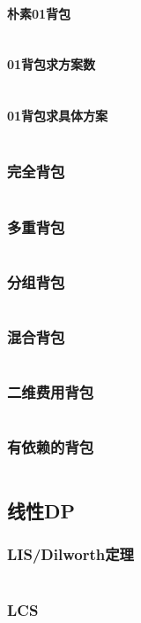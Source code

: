 \documentclass[a4paper,12pt]{article}
\begin{document}
\paragraph{朴素01背包}
\inputminted[breaklines]{c++}{dp/bag/01.cc}
\paragraph{01背包求方案数}
\inputminted[breaklines]{c++}{dp/bag/sum.cc}
\paragraph{01背包求具体方案}
\inputminted[breaklines]{c++}{dp/bag/01_way.cc}
\subsubsection{完全背包}
\inputminted[breaklines]{c++}{dp/bag/comp.cc}
\subsubsection{多重背包}
\inputminted[breaklines]{c++}{dp/bag/mul.cc}
\subsubsection{分组背包}
\inputminted[breaklines]{c++}{dp/bag/group.cc}
\subsubsection{混合背包}
\inputminted[breaklines]{c++}{dp/bag/mix.cc}
\subsubsection{二维费用背包}
\inputminted[breaklines]{c++}{dp/bag/2di.cc}
\subsubsection{有依赖的背包}
\inputminted[breaklines]{c++}{dp/bag/dep.cc}

\subsection{线性DP}
\subsubsection{LIS/Dilworth定理}
\inputminted[breaklines]{c++}{dp/linear/lis.cc}
\subsubsection{LCS}
\inputminted[breaklines]{c++}{dp/linear/lcs.cc}
\end{document}
